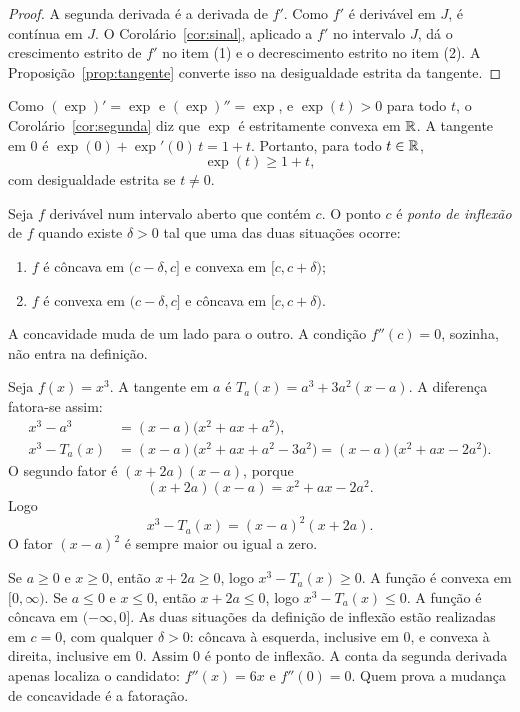 \documentclass[11pt,a4paper]{article}
\begin{document}
\begin{proof}
A segunda derivada é a derivada de $f'$. Como $f'$ é derivável em $J$, é contínua em $J$. O Corolário~\ref{cor:sinal}, aplicado a $f'$ no intervalo $J$, dá o crescimento estrito de $f'$ no item (1) e o decrescimento estrito no item (2). A Proposição~\ref{prop:tangente} converte isso na desigualdade estrita da tangente.
\end{proof}

\begin{exemplo}
Como $(\exp)'=\exp$ e $(\exp)''=\exp$, e $\exp(t)>0$ para todo $t$, o Corolário~\ref{cor:segunda} diz que $\exp$ é estritamente convexa em $\mathbb{R}$. A tangente em $0$ é $\exp(0)+\exp'(0)\,t=1+t$. Portanto, para todo $t\in\mathbb{R}$,
\begin{equation}
\label{eq:exp-tangente}
\exp(t)\ge 1+t,
\end{equation}
com desigualdade estrita se $t\neq 0$.
\end{exemplo}

\begin{definicao}
Seja $f$ derivável num intervalo aberto que contém $c$. O ponto $c$ é \emph{ponto de inflexão} de $f$ quando existe $\delta>0$ tal que uma das duas situações ocorre:
\begin{enumerate}
\item $f$ é côncava em $(c-\delta,c]$ e convexa em $[c,c+\delta)$;
\item $f$ é convexa em $(c-\delta,c]$ e côncava em $[c,c+\delta)$.
\end{enumerate}
A concavidade muda de um lado para o outro. A condição $f''(c)=0$, sozinha, não entra na definição.
\end{definicao}

\begin{exemplo}[Inflexão de $x^3$]
Seja $f(x)=x^3$. A tangente em $a$ é $T_a(x)=a^3+3a^2(x-a)$. A diferença fatora-se assim:
\begin{align*}
x^3-a^3
&=(x-a)\bigl(x^2+ax+a^2\bigr),\\
x^3-T_a(x)
&=(x-a)\bigl(x^2+ax+a^2-3a^2\bigr)
=(x-a)\bigl(x^2+ax-2a^2\bigr).
\end{align*}
O segundo fator é $(x+2a)(x-a)$, porque
\[
(x+2a)(x-a)=x^2+ax-2a^2.
\]
Logo
\[
x^3-T_a(x)=(x-a)^2(x+2a).
\]
O fator $(x-a)^2$ é sempre maior ou igual a zero.

Se $a\ge 0$ e $x\ge 0$, então $x+2a\ge 0$, logo $x^3-T_a(x)\ge 0$. A função é convexa em $[0,\infty)$. Se $a\le 0$ e $x\le 0$, então $x+2a\le 0$, logo $x^3-T_a(x)\le 0$. A função é côncava em $(-\infty,0]$. As duas situações da definição de inflexão estão realizadas em $c=0$, com qualquer $\delta>0$: côncava à esquerda, inclusive em $0$, e convexa à direita, inclusive em $0$. Assim $0$ é ponto de inflexão. A conta da segunda derivada apenas localiza o candidato: $f''(x)=6x$ e $f''(0)=0$. Quem prova a mudança de concavidade é a fatoração.
\end{exemplo}
\end{document}
